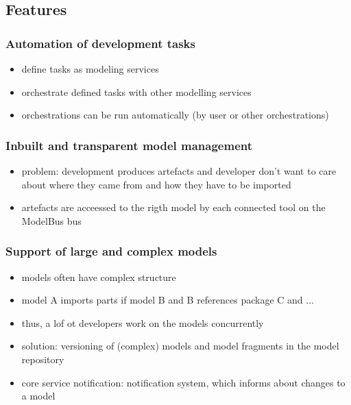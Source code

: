 \subsection{Features}

\subsubsection{Automation of development tasks}

\begin{itemize}
\item define tasks as modeling services
\item orchestrate defined tasks with other modelling services
\item orchestrations can be run automatically (by user or other orchestrations)
\end{itemize}

\subsubsection{Inbuilt and transparent model management}

\begin{itemize}
\item problem: development produces artefacts and developer don't want to care about where they came from and how they have to be imported
\item artefacts are acceessed to the rigth model by each connected tool on the ModelBus bus
\end{itemize}

\subsubsection{Support of large and complex models}

\begin{itemize}
\item models often have complex structure
\item model A imports parts if model B and B references package C and ...
\item thus, a lof ot developers work on the models concurrently
\item solution: versioning of (complex) models and model fragments in the model repository
\item core service notification: notification system, which informs about changes to a model
\end{itemize}

